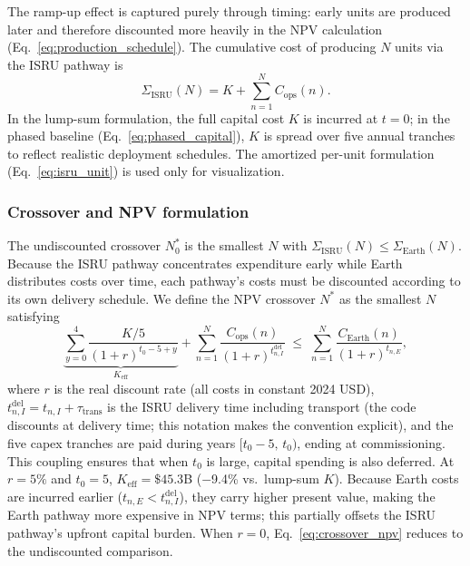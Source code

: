 \documentclass[preprint,12pt]{elsarticle}
\begin{document}
The ramp-up effect is captured purely through timing: early units are produced later and therefore discounted more heavily in the NPV calculation (Eq.~\ref{eq:production_schedule}). The cumulative cost of producing $N$ units via the ISRU pathway is
\begin{equation}
  \Sigma_{\mathrm{ISRU}}(N) = K + \sum_{n=1}^{N} C_{\mathrm{ops}}(n).
  \label{eq:isru_cum}
\end{equation}
In the lump-sum formulation, the full capital cost $K$ is incurred at $t=0$; in the phased baseline (Eq.~\ref{eq:phased_capital}), $K$ is spread over five annual tranches to reflect realistic deployment schedules. The amortized per-unit formulation (Eq.~\ref{eq:isru_unit}) is used only for visualization.

\subsubsection{Crossover and NPV formulation}

The undiscounted crossover $N^*_0$ is the smallest $N$ with $\Sigma_{\mathrm{ISRU}}(N) \leq \Sigma_{\mathrm{Earth}}(N)$. Because the ISRU pathway concentrates expenditure early while Earth distributes costs over time, each pathway's costs must be discounted according to its own delivery schedule. We define the NPV crossover $N^*$ as the smallest $N$ satisfying
\begin{equation}
  \underbrace{\sum_{y=0}^{4} \frac{K/5}{(1+r)^{t_0 - 5 + y}}}_{K_{\mathrm{eff}}} + \sum_{n=1}^{N} \frac{C_{\mathrm{ops}}(n)}{(1+r)^{t_{n,I}^{\mathrm{del}}}} \;\leq\; \sum_{n=1}^{N} \frac{C_{\mathrm{Earth}}(n)}{(1+r)^{t_{n,E}}},
  \label{eq:crossover_npv}
\end{equation}
where $r$ is the real discount rate (all costs in constant 2024 USD), $t_{n,I}^{\mathrm{del}} = t_{n,I} + \tau_{\mathrm{trans}}$ is the ISRU delivery time including transport (the code discounts at delivery time; this notation makes the convention explicit), and the five capex tranches are paid during years $[t_0 - 5,\, t_0)$, ending at commissioning. This coupling ensures that when $t_0$ is large, capital spending is also deferred. At $r = 5\%$ and $t_0 = 5$, $K_{\mathrm{eff}} = \$45.3$B ($-$9.4\% vs.\ lump-sum $K$). Because Earth costs are incurred earlier ($t_{n,E} < t_{n,I}^{\mathrm{del}}$), they carry higher present value, making the Earth pathway more expensive in NPV terms; this partially offsets the ISRU pathway's upfront capital burden. When $r = 0$, Eq.~\ref{eq:crossover_npv} reduces to the undiscounted comparison.
\end{document}
